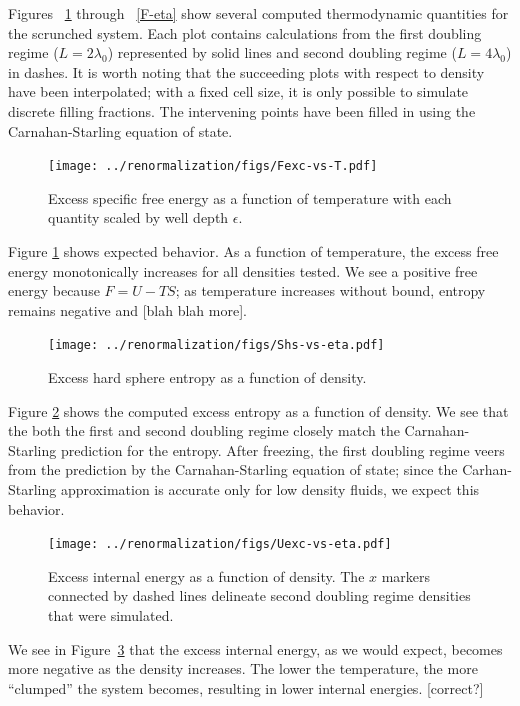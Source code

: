 \documentclass[12pt]{article}
\newcommand{\ignore}[1]{}
\begin{document}
Figures ~\ref{F-T} through ~\ref{F-eta} show several computed thermodynamic quantities for the scrunched system. Each plot contains calculations from the first doubling regime ($L=2\lambda_0$) represented by solid lines and second doubling regime ($L = 4\lambda_0$) in dashes. It is worth noting that the succeeding plots with respect to density have been interpolated; with a fixed cell size, it is only possible to simulate discrete filling fractions. The intervening points have been filled in using the Carnahan-Starling equation of state.\\  
\begin{figure}  
\centering
    \texttt{[image: ../renormalization/figs/Fexc-vs-T.pdf]}
    \caption{Excess specific free energy as a function of temperature with each quantity scaled by well depth $\epsilon$. }
    \label{F-T}
\end{figure}

Figure \ref{F-T} shows expected behavior. As a function of temperature, the excess free energy monotonically increases for all densities tested. We see a positive free energy because $F = U -TS$; as temperature increases without bound, entropy remains negative and [blah blah more].\\

\begin{figure}
\centering
    \texttt{[image: ../renormalization/figs/Shs-vs-eta.pdf]}
    \caption{Excess hard sphere entropy as a function of density.}
    \label{Shs-eta}
\end{figure}
\ignore{Filling fraction or density? Value in distinction? We never use number density for the sake of units...}
Figure \ref{Shs-eta} shows the computed excess entropy as a function of density. We see that the both the first and second doubling regime closely match the Carnahan-Starling prediction for the entropy. After freezing, the first doubling regime veers from the prediction by the Carnahan-Starling equation of state; since the Carhan-Starling approximation is accurate only for low density fluids, we expect this behavior.\\

\begin{figure}
    \centering
    \texttt{[image: ../renormalization/figs/Uexc-vs-eta.pdf]}
    \caption{Excess internal energy as a function of density. The $x$ markers connected by dashed lines delineate second doubling regime densities that were simulated.}
    \label{U-eta}
\end{figure}
We see in Figure~\ref{U-eta} that the excess internal energy, as we would expect, becomes more negative as the density increases. The lower the temperature, the more ``clumped'' the system becomes, resulting in lower internal energies. [correct?]
\end{document}
